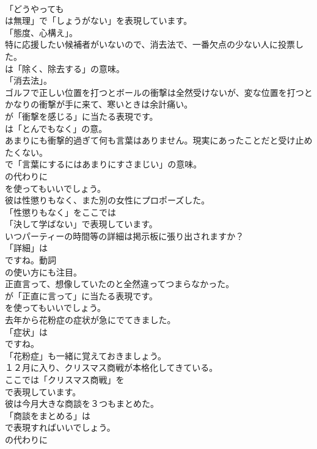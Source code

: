 \documentclass[8pt]{extreport}
\begin{document}
\begin{CJK}{UTF8}{min}
\\	「どうやっても 
\\	は無理」で「しょうがない」を表現しています。
\\	「態度、心構え」。	
\\	特に応援したい候補者がいないので、消去法で、一番欠点の少ない人に投票した。 
\\	は「除く、除去する」の意味。
\\	「消去法」。	
\\	ゴルフで正しい位置を打つとボールの衝撃は全然受けないが、変な位置を打つとかなりの衝撃が手に来て、寒いときは余計痛い。 
\\	が「衝撃を感じる」に当たる表現です。
\\	は「とんでもなく」の意。	
\\	あまりにも衝撃的過ぎて何も言葉はありません。現実にあったことだと受け止めたくない。 
\\	で「言葉にするにはあまりにすさまじい」の意味。
\\	の代わりに 
\\	を使ってもいいでしょう。	
\\	彼は性懲りもなく、また別の女性にプロポーズした。 
\\	「性懲りもなく」をここでは
\\	「決して学ばない」で表現しています。	
\\	いつパーティーの時間等の詳細は掲示板に張り出されますか？ 
\\	「詳細」は
\\	ですね。動詞
\\	の使い方にも注目。	
\\	正直言って、想像していたのと全然違ってつまらなかった。 
\\	が「正直に言って」に当たる表現です。
\\	を使ってもいいでしょう。	
\\	去年から花粉症の症状が急にでてきました。 
\\	「症状」は
\\	ですね。
\\	「花粉症」も一緒に覚えておきましょう。	
\\	１２月に入り、クリスマス商戦が本格化してきている。 
\\	ここでは「クリスマス商戦」を
\\	で表現しています。	
\\	彼は今月大きな商談を３つもまとめた。 
\\	「商談をまとめる」は 
\\	で表現すればいいでしょう。
\\	の代わりに 

\end{CJK}
\end{document}
